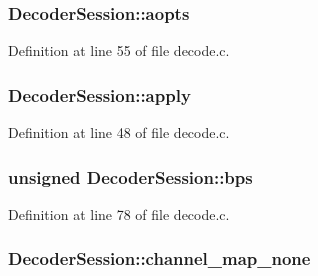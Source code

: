 \subsubsection[{\texorpdfstring{aopts}{aopts}}]{ Decoder\+Session\+::aopts}\hypertarget{struct_decoder_session_aee9b4057b5ed3c689576e44e86ffc0ed}{}\label{struct_decoder_session_aee9b4057b5ed3c689576e44e86ffc0ed}


Definition at line 55 of file decode.\+c.

\subsubsection[{\texorpdfstring{apply}{apply}}]{ Decoder\+Session\+::apply}\hypertarget{struct_decoder_session_adfd9e5e1b9369320c3b5cddcb8e8d65a}{}\label{struct_decoder_session_adfd9e5e1b9369320c3b5cddcb8e8d65a}


Definition at line 48 of file decode.\+c.

\subsubsection[{\texorpdfstring{bps}{bps}}]{\setlength{\rightskip}{0pt plus 5cm}unsigned Decoder\+Session\+::bps}\hypertarget{struct_decoder_session_a8e4a5731c49edf1b4b51d138d02a0ad9}{}\label{struct_decoder_session_a8e4a5731c49edf1b4b51d138d02a0ad9}


Definition at line 78 of file decode.\+c.

\subsubsection[{\texorpdfstring{channel\+\_\+map\+\_\+none}{channel_map_none}}]{ Decoder\+Session\+::channel\+\_\+map\+\_\+none}\hypertarget{struct_decoder_session_a9e72001dce47430891b7d0e4a3a298b9}{}\label{struct_decoder_session_a9e72001dce47430891b7d0e4a3a298b9}


